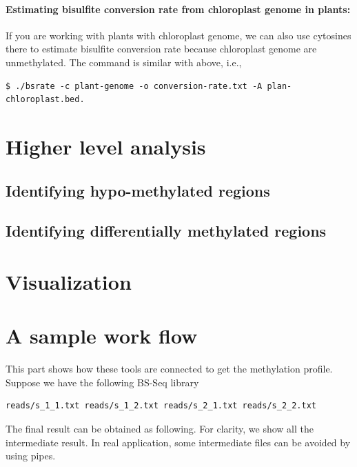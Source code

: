 \documentclass{article}
\begin{document}
\paragraph{Estimating bisulfite conversion rate from chloroplast
  genome in plants:} If you are working with plants with chloroplast
genome, we can also use cytosines there to estimate bisulfite
conversion rate because chloroplast genome are unmethylated. The
command is similar with above, i.e., 
\begin{verbatim}
$ ./bsrate -c plant-genome -o conversion-rate.txt -A plan-chloroplast.bed.  
\end{verbatim}
 
\section{Higher level analysis}
\label{sec:high-level-analys}

\subsection{Identifying hypo-methylated regions}
\label{sec:ident-hypo-methyl}

\subsection{Identifying differentially methylated regions}
\label{sec:ident-diff-methyl}


\section{Visualization}
\label{sec:visualization}





\section{A sample work flow}
This part shows how these tools are connected to get the methylation
profile. Suppose we have the following BS-Seq library
\begin{verbatim}
reads/s_1_1.txt reads/s_1_2.txt reads/s_2_1.txt reads/s_2_2.txt
\end{verbatim}

The final result can be obtained as following. For clarity, we show
all the intermediate result. In real application, some intermediate
files can be avoided by using pipes.
\end{document}
